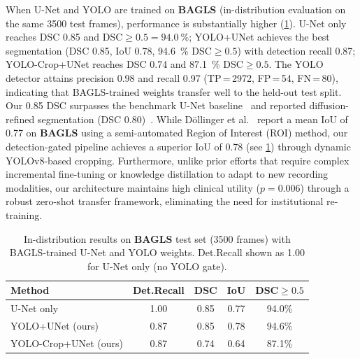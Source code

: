 \documentclass[preprint,12pt]{elsarticle}
\newcommand{\bagls}{\textbf{BAGLS}}
\newcommand{\yolounet}{YOLO+UNet}
\newcommand{\yolocrop}{YOLO-Crop+UNet}
\begin{document}
When U-Net and YOLO are trained on \bagls{} (in-distribution evaluation on the
same \num{3500} test frames), performance is substantially higher
(\cref{tab:bagls_indist}).
U-Net only reaches DSC \num{0.85} and DSC${\geq}0.5 = \SI{94.0}{\%}$;
\yolounet{} achieves the best segmentation (DSC \num{0.85}, IoU \num{0.78},
\SI{94.6}{\%} DSC${\geq}0.5$) with detection recall \num{0.87};
\yolocrop{} reaches DSC \num{0.74} and \SI{87.1}{\%} DSC${\geq}0.5$.
The YOLO detector attains precision \num{0.98} and recall \num{0.97}
(TP\,=\,\num{2972}, FP\,=\,\num{54}, FN\,=\,\num{80}), indicating that
BAGLS-trained weights transfer well to the held-out test split.
Our \num{0.85} DSC surpasses the benchmark U-Net baseline~\cite{gomez2020bagls} and reported diffusion-refined segmentation (DSC \num{0.80})~\cite{wu2024medsegdiff}.
While D\"{o}llinger et al.\ \cite{dollinger2022} report a mean IoU of \num{0.77}
on \bagls{} using a semi-automated Region of Interest (ROI) method, our
detection-gated pipeline achieves a superior IoU of \num{0.78} (see
\cref{tab:bagls_indist}) through dynamic YOLOv8-based cropping.
Furthermore, unlike prior efforts that require complex incremental
fine-tuning or knowledge distillation to adapt to new recording modalities,
our architecture maintains high clinical utility ($p{=}0.006$) through a
robust zero-shot transfer framework, eliminating the need for institutional
re-training.

\begin{table}[t]
\centering
\caption{In-distribution results on \bagls{} test set (\num{3500} frames)
  with BAGLS-trained U-Net and YOLO weights.
  Det.Recall shown as 1.00 for U-Net only (no YOLO gate).}
\label{tab:bagls_indist}
\small
\setlength{\tabcolsep}{4pt}
\begin{tabular}{lcccc}
\toprule
Method & Det.Recall & DSC & IoU & DSC${\geq}0.5$ \\
\midrule
U-Net only                     & 1.00 & 0.85 & 0.77 & 94.0\% \\
\yolounet{} (ours)             & 0.87 & 0.85 & 0.78 & 94.6\% \\
\yolocrop{} (ours)             & 0.87 & 0.74 & 0.64 & 87.1\% \\
\bottomrule
\end{tabular}
\end{table}
\end{document}
